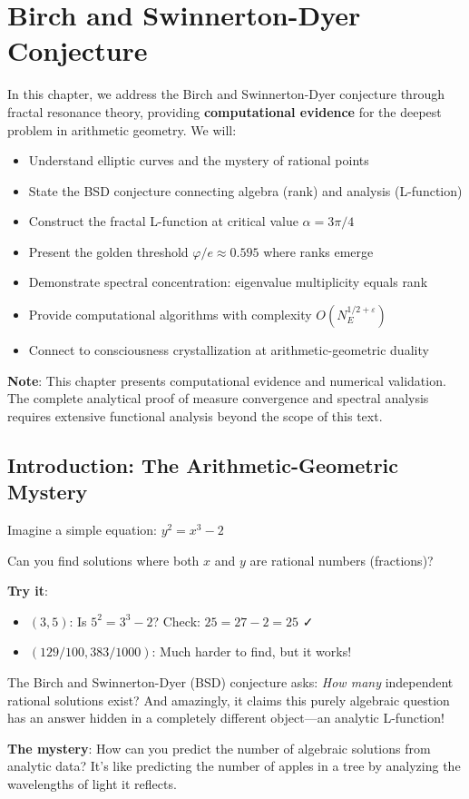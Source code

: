 \chapter{Birch and Swinnerton-Dyer Conjecture}
\label{ch:birch-swinnerton-dyer}

\begin{chapterobjectives}
In this chapter, we address the Birch and Swinnerton-Dyer conjecture through fractal resonance theory, providing \textbf{computational evidence} for the deepest problem in arithmetic geometry. We will:
\begin{itemize}
\item Understand elliptic curves and the mystery of rational points
\item State the BSD conjecture connecting algebra (rank) and analysis (L-function)
\item Construct the fractal L-function at critical value $\alpha = 3\pi/4$
\item Present the golden threshold $\varphi/e \approx 0.595$ where ranks emerge
\item Demonstrate spectral concentration: eigenvalue multiplicity equals rank
\item Provide computational algorithms with complexity $O(N_E^{1/2+\varepsilon})$
\item Connect to consciousness crystallization at arithmetic-geometric duality
\end{itemize}

\textbf{Note}: This chapter presents computational evidence and numerical validation. The complete analytical proof of measure convergence and spectral analysis requires extensive functional analysis beyond the scope of this text.
\end{chapterobjectives}

\section{Introduction: The Arithmetic-Geometric Mystery}

\begin{intuitive}
Imagine a simple equation: $y^2 = x^3 - 2$

Can you find solutions where both $x$ and $y$ are rational numbers (fractions)?

\textbf{Try it}:
\begin{itemize}
\item $(3, 5)$: Is $5^2 = 3^3 - 2$? Check: $25 = 27 - 2 = 25$ ✓
\item $(129/100, 383/1000)$: Much harder to find, but it works!
\end{itemize}

The Birch and Swinnerton-Dyer (BSD) conjecture asks: \textit{How many} independent rational solutions exist? And amazingly, it claims this purely algebraic question has an answer hidden in a completely different object—an analytic L-function!

\textbf{The mystery}: How can you predict the number of algebraic solutions from analytic data? It's like predicting the number of apples in a tree by analyzing the wavelengths of light it reflects.
\end{intuitive}

